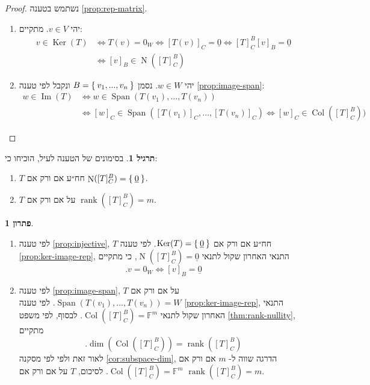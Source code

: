 \documentclass[12pt]{report}
\theoremstyle{plain}
\theoremstyle{definition}
\newtheorem{exercise}{תרגיל}[chapter]
\newtheorem*{solution}{פתרון}
\newcommand{\F}{\mathbb{F}}
\DeclareMathOperator{\rank}{rank}
\newcommand{\0}{\mathbf{0}}
\DeclareMathOperator{\Span}{Span}
\DeclareMathOperator{\Col}{Col}
\DeclareMathOperator{\Null}{N}
\DeclareMathOperator{\Ker}{Ker}
\DeclareMathOperator{\Image}{Im}
\begin{document}
\begin{proof}
נשתמש בטענה 
\ref{prop:rep-matrix}.

\begin{enumerate}[label=\alph*.]
\item 
יהי
$v\in V$.
מתקיים:
$$
\begin{aligned}
v\in\Ker(T) &\iff T(v)=0_W \iff [T(v)]_C=\underline{0} \iff [T]_C^B[v]_B=\underline{0} \\
&\iff [v]_B\in\Null([T]_C^B)
\end{aligned}
$$


\item 
יהי
$w\in W$.
נסמן
$B=\Set{v_1,...,v_n}$
ונקבל לפי טענה
\ref{prop:image-span}:
$$
\begin{aligned}
w\in\Image(T) &\iff w\in\Span(T(v_1),...,T(v_n)) \\
&\iff [w]_C\in \Span([T(v_1)]_C,...,[T(v_n)]_C)  \iff [w]_C\in \Col([T]_C^B))
\end{aligned}
$$

\end{enumerate}
\end{proof}

\begin{exercise}
בסימונים של הטענה לעיל, הוכיחו כי:
\begin{enumerate}[label=\alph*.]
\item 
$T$
חח״ע אם ורק אם
$\Null([T]_C^B)=\Set{\underline{0}}$.


\item 
$T$
על אם ורק אם
$\rank([T]_C^B)=m$.


\end{enumerate}
\end{exercise}

\begin{solution}
\begin{enumerate}[label=\alph*.]
\item 
לפי טענה
\ref{prop:injective},
$T$
חח״ע אם ורק אם 
$\Ker(T)=\Set{\underline{0}}$.
לפי טענה
\ref{prop:ker-image-rep},
התנאי האחרון שקול לתנאי
$\Null([T]_C^B)=\underline{0}$,
כי מתקיים
$$
.v=0_W \iff [v]_B=\underline{0}
$$


\item 
לפי טענה
\ref{prop:image-span},
$T$
על אם ורק אם
$\Span(T(v_1),...,T(v_n))=W$.
לפי טענה
\ref{prop:ker-image-rep},
התנאי האחרון שקול לתנאי
$\Col([T]_C^B)=\F^m$.
לבסוף, לפי משפט
\ref{thm:rank-nullity},
מתקיים
$$
.\dim(\Col([T]_C^B))=\rank([T]_C^B)
$$
לאור זאת ולפי לפי מסקנה 
\ref{cor:subspace-dim},
הדרגה שווה ל-
$m$
אם ורק אם
$\Col([T]_C^B)=\F^m$.
לסיכום,
$T$
על אם ורק אם 
$\rank([T]_C^B)=m$.


\end{enumerate}
\end{solution}
\end{document}
